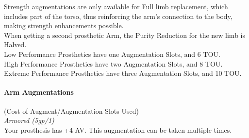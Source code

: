\documentclass[a4paper, twocolumn, openany]{book}
\newlength{\indentlen}
\newcommand{\tabto}[1]{\setlength{\leftskip}{#1\indentlen}}
\begin{document}
{Strength augmentations are only available for Full limb replacement, which includes part of the
torso, thus reinforcing the arm’s connection to the body, making strength enhancements
possible.\\
When getting a second prosthetic Arm, the Purity Reduction for the new limb is Halved.\\

Low Performance Prosthetics have one Augmentation Slots, and 6 TOU.\\
High Performance Prosthetics have two Augmentation Slots, and 8 TOU.\\
Extreme Performance Prosthetics have three Augmentation Slots, and 10 TOU.\\

\paragraph{Arm Augmentations} (Cost of Augment/Augmentation Slots Used)\\

\tabto{1}
	{\slshape Armored (5gp/1)\\}
	Your prosthesis has +4 AV. This augmentation can be taken multiple times.\\

}
\end{document}
